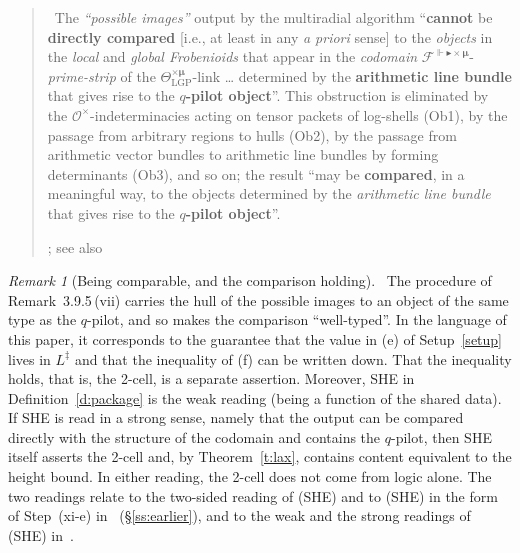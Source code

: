 \documentclass[11pt,a4paper]{article}
\newcommand{\lab}[2]{{\upshape\fcolorbox{#1}{#1!8}{\scriptsize\sffamily\bfseries\textcolor{#1}{#2}}}}
\newcommand{\tagS}{\lab{blue}{S}}
\newcommand{\tagH}{\lab{BurntOrange}{H}}
\newcommand{\srcquote}[2]{\begin{quote}\small\tagS\ #1\par\nopagebreak\hfill{\footnotesize #2}\end{quote}}
\newcommand{\q}[1]{``#1''}
\theoremstyle{plain}
\theoremstyle{definition}
\theoremstyle{remark}
\newtheorem{remark}[theorem]{Remark}
\begin{document}
\srcquote{The \emph{``possible images''} output by the multiradial algorithm \q{\textbf{cannot} be
\textbf{directly compared} [i.e., at least in any \emph{a priori} sense] to the \emph{objects} in the \emph{local} and
\emph{global Frobenioids} that appear in the \emph{codomain}
$\mathcal{F}^{\Vdash\blacktriangleright\times\boldsymbol{\mu}}$-\emph{prime-strip} of the
$\Theta^{\times\boldsymbol{\mu}}_{\mathrm{LGP}}$-link \dots{} determined by the \textbf{arithmetic line bundle} that gives
rise to the \textbf{\boldmath$q$-pilot object}}. This obstruction is eliminated by the $\mathcal{O}^\times$-indeterminacies
acting on tensor packets of log-shells (Ob1), by the passage from arbitrary regions to hulls (Ob2), by the passage from
arithmetic vector bundles to arithmetic line bundles by forming determinants (Ob3), and so on; the result \q{may be
\textbf{compared}, in a meaningful way, to the objects determined by the \emph{arithmetic line bundle} that gives rise to
the \textbf{\boldmath$q$-pilot object}}.}{\cite[Remark~3.9.5\,(vii)]{IUT3}; see also \cite[Remark~3.11.1\,(iv)]{IUT3}}

\begin{remark}[Being comparable, and the comparison holding]\label{r:comparable}\tagH\ 
The procedure of Remark~3.9.5\,(vii) carries the hull of the possible images to an object of the same type as the
$q$-pilot, and so makes the comparison ``well-typed''. In the language of this paper, it corresponds to the guarantee
that the value in (e) of Setup~\ref{setup} lives in $L^\ddagger$ and that the inequality of (f) can be written down.
That the inequality holds, that is, the 2-cell, is a separate assertion. Moreover, SHE in Definition~\ref{d:package} is
the weak reading (being a function of the shared data). If SHE is read in a strong sense, namely that the output can
be compared directly with the structure of the codomain and contains the $q$-pilot, then SHE itself asserts the 2-cell
and, by Theorem~\ref{t:lax}, contains content equivalent to the height bound. In either reading, the 2-cell does not
come from logic alone. The two readings relate to the two-sided reading of (SHE) and to (SHE) in the form of
Step~(xi-e) in~\cite{LANAiut} (\S\ref{ss:earlier}), and to the weak and the strong readings of (SHE)
in~\cite[Definition~4, Corollary~11]{W311}.
\end{remark}
\end{document}
